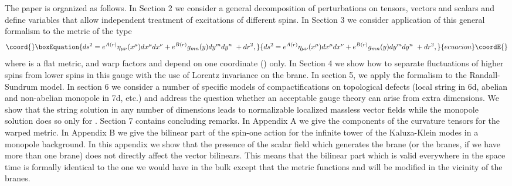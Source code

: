 \documentclass[a4paper,12pt]{article}
\begin{document}
The paper is organized as follows. In Section 2 we consider a general
decomposition of perturbations on tensors, vectors and scalars and
define variables that allow independent treatment of excitations of
different spins. In  Section 3 we consider application of this
general formalism to the metric of the type
\begin{equation}\coord{}\boxEquation{
ds^2 =
e^{A(r)}\eta_{\mu\nu}(x^\mu)dx^\mu dx^\nu + e^{B(r)} g_{mn}(y)dy^m
dy^n~+dr^2,
\label{simpl}
}{
ds^2 =
e^{A(r)}\eta_{\mu\nu}(x^\mu)dx^\mu dx^\nu + e^{B(r)} g_{mn}(y)dy^m
dy^n~+dr^2,
}{ecuacion}\coordE{}\end{equation}
where \myHighlight{$\eta_{\mu\nu}$}\coordHE{} is a flat metric, and warp factors \coordHE{} and \coordHE{}
depend on one coordinate (\coordHE{}) only.  In Section 4 we show how to
separate fluctuations of higher spins from lower spins in this gauge
with the use of Lorentz invariance on the brane. In section 5, we
apply the formalism to the Randall-Sundrum model. In section 6 we
consider a number of specific models of compactifications on
topological defects (local string in 6d, abelian and non-abelian
monopole in 7d, etc.)  and address the question whether an acceptable
gauge theory can arise from extra dimensions. We show that the string
solution in any number of dimensions leads to normalizable localized
massless vector fields while the monopole solution does so only for
\coordHE{}. Section 7 contains concluding remarks. In Appendix A we
give the components of the curvature tensors for the warped metric.
In Appendix B we give the bilinear part of the spin-one action for
the infinite tower of the Kaluza-Klein modes in a monopole
background. In this appendix we show that the presence of the scalar
field which generates the brane (or the branes, if we have more than
one brane) does not directly affect the vector bilinears. This means
that the bilinear part which is valid everywhere in the space time is
formally identical to the one we would have in the bulk except that
the metric functions \coordHE{} and \coordHE{} will be modified in the vicinity of
the branes.
\end{document}

